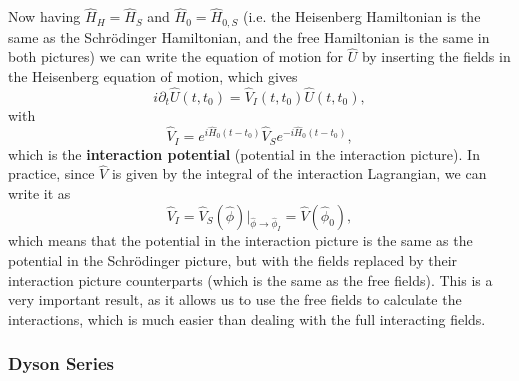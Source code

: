 Now having \(\hat{H}_H = \hat{H}_S\) and \(\hat{H}_0 = \hat{H}_{0,S}\) (i.e. the Heisenberg Hamiltonian is the same as the Schrödinger Hamiltonian, and the free Hamiltonian is the same in both pictures) we can write the equation of motion for \(\hat{U}\) by inserting the fields in the Heisenberg equation of motion, which gives
\begin{equation}
    i \partial_t \hat{U}(t,t_0) = \hat{V}_I (t,t_0) \hat{U}(t,t_0),
    \label{eq:interaction-picture-evolution}
\end{equation}
with
\[
    \hat{V}_I = e^{i \hat{H}_0 (t-t_0)} \hat{V}_S e^{-i \hat{H}_0 (t-t_0)},
\]
which is the \textbf{interaction potential} (potential in the interaction picture). In practice, since \(\hat{V}\) is given by the integral of the interaction Lagrangian, we can write it as
\[
    \hat{V}_I = \hat{V}_S(\hat{\phi}) \big|_{\hat{\phi} \to \hat{\phi}_I} = \hat{V}(\hat{\phi}_0),
\]
which means that the potential in the interaction picture is the same as the potential in the Schrödinger picture, but with the fields replaced by their interaction picture counterparts (which is the same as the free fields). This is a very important result, as it allows us to use the free fields to calculate the interactions, which is much easier than dealing with the full interacting fields.

\subsubsection{Dyson Series}

